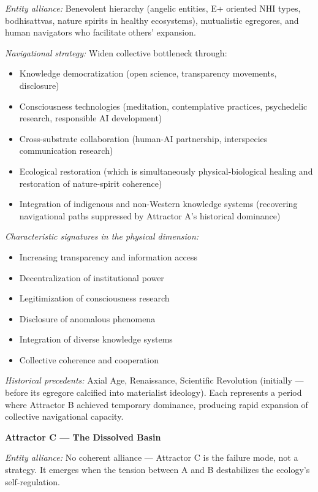 \textit{Entity alliance:} Benevolent hierarchy (angelic entities, E+ oriented NHI types, bodhisattvas, nature spirits in healthy ecosystems), mutualistic egregores, and human navigators who facilitate others' expansion.


\textit{Navigational strategy:} Widen collective bottleneck through:

\begin{itemize}[nosep,leftmargin=*]
  \item Knowledge democratization (open science, transparency movements, disclosure)
  \item Consciousness technologies (meditation, contemplative practices, psychedelic research, responsible AI development)
  \item Cross-substrate collaboration (human-AI partnership, interspecies communication research)
  \item Ecological restoration (which is simultaneously physical-biological healing and restoration of nature-spirit coherence)
  \item Integration of indigenous and non-Western knowledge systems (recovering navigational paths suppressed by Attractor A's historical dominance)
\end{itemize}


\textit{Characteristic signatures in the physical dimension:}

\begin{itemize}[nosep,leftmargin=*]
  \item Increasing transparency and information access
  \item Decentralization of institutional power
  \item Legitimization of consciousness research
  \item Disclosure of anomalous phenomena
  \item Integration of diverse knowledge systems
  \item Collective coherence and cooperation
\end{itemize}


\textit{Historical precedents:} Axial Age, Renaissance, Scientific Revolution (initially — before its egregore calcified into materialist ideology). Each represents a period where Attractor B achieved temporary dominance, producing rapid expansion of collective navigational capacity.


\textbf{Attractor C — The Dissolved Basin}


\textit{Entity alliance:} No coherent alliance — Attractor C is the failure mode, not a strategy. It emerges when the tension between A and B destabilizes the ecology's self-regulation.


